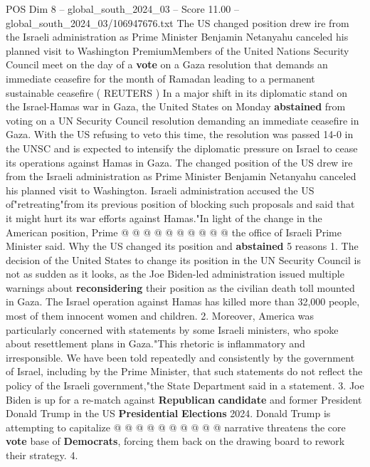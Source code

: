 \begin{textsample}{POS Dim 8 – global\_south\_2024\_03 – Score 11.00 – global\_south\_2024\_03/106947676.txt}  \label{ex:f8_pos_092}
The US changed position drew ire from the Israeli administration as Prime Minister Benjamin Netanyahu canceled his planned visit to Washington PremiumMembers of the United Nations Security Council meet on the day of a \textbf{vote} on a Gaza resolution that demands an immediate ceasefire for the month of Ramadan leading to a permanent sustainable ceasefire ( REUTERS ) In a major shift in its diplomatic stand on the Israel-Hamas war in Gaza, the United States on Monday \textbf{abstained} from voting on a UN Security Council resolution demanding an immediate ceasefire in Gaza.
With the US refusing to veto this time, the resolution was passed 14-0 in the UNSC and is expected to intensify the diplomatic pressure on Israel to cease its operations against Hamas in Gaza.
The changed position of the US drew ire from the Israeli administration as Prime Minister Benjamin Netanyahu canceled his planned visit to Washington.
Israeli administration accused the US of"retreating"from its previous position of blocking such proposals and said that it might hurt its war efforts against Hamas."In light of the change in the American position, Prime @ @ @ @ @ @ @ @ @ @ the office of Israeli Prime Minister said.
Why the US changed its position and \textbf{abstained} 5 reasons 1.
The decision of the United States to change its position in the UN Security Council is not as sudden as it looks, as the Joe Biden-led administration issued multiple warnings about \textbf{reconsidering} their position as the civilian death toll mounted in Gaza.
The Israel operation against Hamas has killed more than 32,000 people, most of them innocent women and children. 2.
Moreover, America was particularly concerned with statements by some Israeli ministers, who spoke about resettlement plans in Gaza."This rhetoric is inflammatory and irresponsible.
We have been told repeatedly and consistently by the government of Israel, including by the Prime Minister, that such statements do not reflect the policy of the Israeli government,"the State Department said in a statement. 3.
Joe Biden is up for a re-match against \textbf{Republican} \textbf{candidate} and former President Donald Trump in the US \textbf{Presidential} \textbf{Elections} 2024.
Donald Trump is attempting to capitalize @ @ @ @ @ @ @ @ @ @ narrative threatens the core \textbf{vote} base of \textbf{Democrats}, forcing them back on the drawing board to rework their strategy. 4.

\end{textsample}
